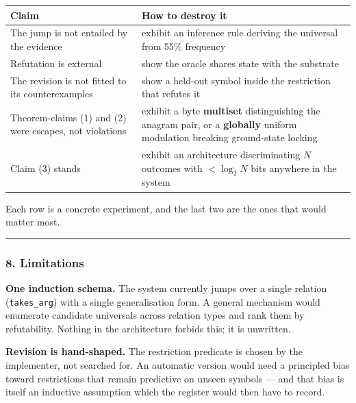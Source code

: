 \documentclass[
  11pt,
  a4paper,
]{article}
\begin{document}
\begin{longtable}[]{@{}
  >{\raggedright\arraybackslash}p{}
  >{\raggedright\arraybackslash}p{}@{}}
\toprule\noalign{}
\begin{minipage}[b]{\linewidth}\raggedright
Claim
\end{minipage} & \begin{minipage}[b]{\linewidth}\raggedright
How to destroy it
\end{minipage} \\
\midrule\noalign{}
\endhead
\bottomrule\noalign{}
\endlastfoot
The jump is not entailed by the evidence & exhibit an inference rule
deriving the universal from 55\% frequency \\
Refutation is external & show the oracle shares state with the
substrate \\
The revision is not fitted to its counterexamples & show a held-out
symbol inside the restriction that refutes it \\
Theorem-claims (1) and (2) were escapes, not violations & exhibit a byte
\textbf{multiset} distinguishing the anagram pair, or a
\textbf{globally} uniform modulation breaking ground-state locking \\
Claim (3) stands & exhibit an architecture discriminating \(N\) outcomes
with \(< \log_2 N\) bits anywhere in the system \\
\end{longtable}

Each row is a concrete experiment, and the last two are the ones that
would matter most.

\begin{center}\rule{0.5\linewidth}{0.5pt}\end{center}

\subsubsection{8. Limitations}\label{limitations}

\textbf{One induction schema.} The system currently jumps over a single
relation (\texttt{takes\_arg}) with a single generalisation form. A
general mechanism would enumerate candidate universals across relation
types and rank them by refutability. Nothing in the architecture forbids
this; it is unwritten.

\textbf{Revision is hand-shaped.} The restriction predicate is chosen by
the implementer, not searched for. An automatic version would need a
principled bias toward restrictions that remain predictive on unseen
symbols --- and that bias is itself an inductive assumption which the
register would then have to record.
\end{document}
